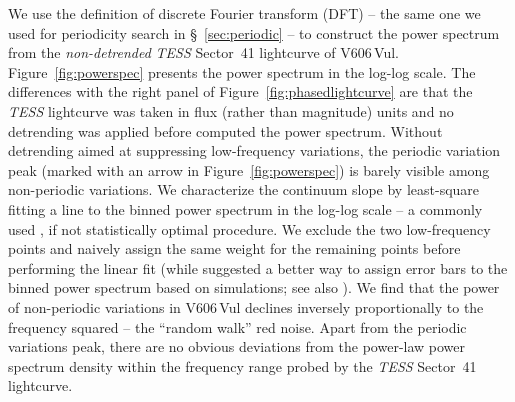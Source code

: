 \documentclass[twocolumn]{aastex631}
\newcommand{\nova}{V606\,Vul}
\begin{document}
We use the \cite{1975Ap&SS..36..137D} definition of discrete Fourier
transform (DFT) -- the same one we used for periodicity search in \S~\ref{sec:periodic}
-- to construct the power spectrum from the {\it non-detrended} {\em TESS} Sector~41 lightcurve of \nova{}. 
Figure~\ref{fig:powerspec} presents the power spectrum in the log-log scale.
The differences with the right panel of Figure~\ref{fig:phasedlightcurve}
are that the {\em TESS} lightcurve was taken in flux (rather than magnitude) units
and no detrending was applied before computed the power spectrum.
Without detrending aimed at suppressing low-frequency variations,
the periodic variation peak (marked with an arrow in Figure~\ref{fig:powerspec}) 
is barely visible among non-periodic variations. 
%
We characterize the continuum slope by least-square fitting a line to 
the binned power spectrum in the log-log scale -- a commonly used 
\citep[e.g.,][]{2013ApJ...773...89W,2020MNRAS.492.5524O,2021MNRAS.501.1100R}, if not statistically optimal procedure.
%
We exclude the two low-frequency points and naively assign the same weight
for the remaining points before performing the linear fit 
(while \citealt{2002MNRAS.332..231U}
suggested a better way to assign error bars to the binned power spectrum
based on simulations; see also \citealt{2018ApJ...860L..10S}).
%
We find that the power of non-periodic variations in \nova{} declines inversely 
proportionally to the frequency squared -- the ``random walk'' red noise. 
Apart from the periodic variations peak, there are no obvious deviations from 
the power-law power spectrum density within the frequency range probed 
by the {\em TESS} Sector~41 lightcurve.
\end{document}

